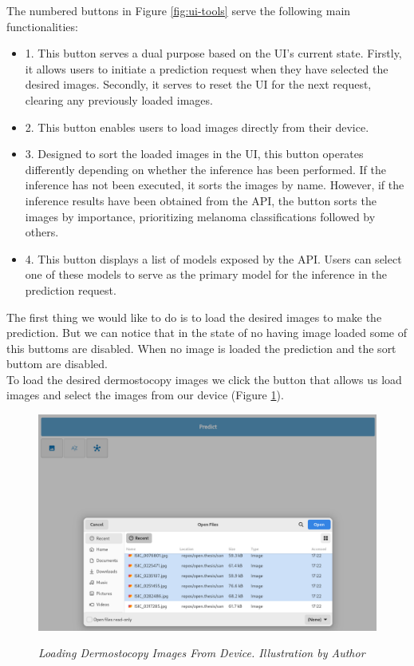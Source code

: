 The numbered buttons in Figure \ref{fig:ui-tools} serve the following
main functionalities:

\begin{itemize}
  \item 1. This button serves a dual purpose based on the UI's current state. Firstly, it allows users to initiate a prediction request when they have selected the desired images. Secondly, it serves to reset the UI for the next request, clearing any previously loaded images.
  \item 2. This button enables users to load images directly from their device.
  \item 3. Designed to sort the loaded images in the UI, this button operates differently depending on whether the inference has been performed. If the inference has not been executed, it sorts the images by name. However, if the inference results have been obtained from the API, the button sorts the images by importance, prioritizing melanoma classifications followed by others.
  \item 4. This button displays a list of models exposed by the API. Users can select one of these models to serve as the primary model for the inference in the prediction request.
\end{itemize}


The first thing we would like to do is to load the desired images to make the
prediction. But we can notice that in the state of no having image loaded some
of this buttoms are disabled. When no image is loaded the prediction and the
sort buttom are disabled. \\

To load the desired dermostocopy images we click the button that allows us load
images and select the images from our device
(Figure \ref{fig:selecting-imgs}).

\begin{figure}[H]
  \centering
  \includegraphics[width=\textwidth]{imatges/results/selecting-images.png}
  \caption[Loading Dermostocopy Images From Device]{\textit{Loading Dermostocopy Images From Device. Illustration by Author}}
  {\label{fig:selecting-imgs}}
\end{figure}

